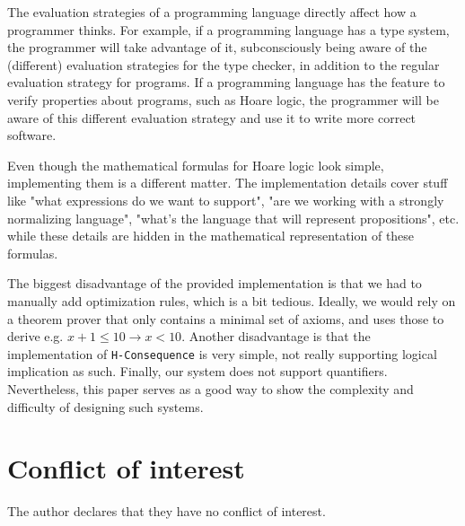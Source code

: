 \documentclass{article}
\begin{document}
The evaluation strategies of a programming language directly affect how a programmer thinks. For example, if a programming language has a type system, the programmer will take advantage of it, subconsciously being aware of the (different) evaluation strategies for the type checker, in addition to the regular evaluation strategy for programs. If a programming language has the feature to verify properties about programs, such as Hoare logic, the programmer will be aware of this different evaluation strategy and use it to write more correct software.

Even though the mathematical formulas for Hoare logic look simple, implementing them is a different matter. The implementation details cover stuff like "what expressions do we want to support", "are we working with a strongly normalizing language", "what's the language that will represent propositions", etc. while these details are hidden in the mathematical representation of these formulas.

The biggest disadvantage of the provided implementation is that we had to manually add optimization rules, which is a bit tedious. Ideally, we would rely on a theorem prover that only contains a minimal set of axioms, and uses those to derive e.g. $x + 1 \le 10 \to x < 10$. Another disadvantage is that the implementation of \texttt{H-Consequence} is very simple, not really supporting logical implication as such. Finally, our system does not support quantifiers. Nevertheless, this paper serves as a good way to show the complexity and difficulty of designing such systems.

\section{Conflict of interest}

The author declares that they have no conflict of interest.
\end{document}
